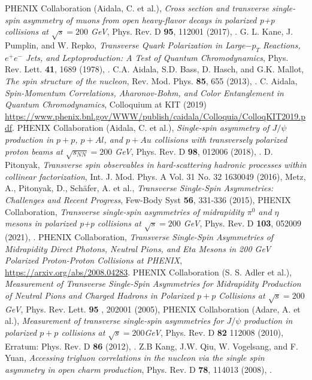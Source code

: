\documentclass[submission, Proceedings]{SciPost}
\begin{document}
\begin{thebibliography}{99}
 PHENIX Collaboration (Aidala, C. et al.), {\it Cross section and transverse single-spin asymmetry of muons from open heavy-flavor decays in polarized p+p collisions at $\sqrt{s}=200$ GeV}, Phys. Rev. D {\bf 95}, 112001 (2017), .
 G. L. Kane, J. Pumplin, and W. Repko, {\it Transverse Quark Polarization in Large$-p_{T}$ Reactions, $e^{+}e^{-}$ Jets, and Leptoproduction: A Test of Quantum Chromodynamics}, Phys. Rev. Lett. {\bf 41}, 1689 (1978), .	
 C.A. Aidala, S.D. Bass, D. Hasch, and G.K. Mallot, {\it The spin structure of the nucleon}, Rev. Mod. Phys. {\bf 85}, 655 (2013), .
 C. Aidala, {\it Spin-Momentum Correlations, Aharonov-Bohm, and Color Entanglement in Quantum Chromodynamics}, Colloquium at KIT (2019)\, \url{https://www.phenix.bnl.gov/WWW/publish/caidala/Colloquia/ColloqKIT2019.pdf}. 
 PHENIX Collaboration (Aidala, C. et al.), {\it Single-spin asymmetry of $J/\psi$ production in $p+p$, $p+Al$, and $p+Au$ collisions with transversely polarized proton beams at $\sqrt{s_{NN}}=200$ GeV}, Phys. Rev. D {\bf 98}, 012006 (2018), .	 
 D. Pitonyak, {\it Transverse spin observables in hard-scattering hadronic processes within collinear factorization}, Int. J. Mod. Phys. A Vol. 31  No. 32 1630049 (2016), 
 Metz, A., Pitonyak, D., Schäfer, A. et al., {\it Transverse Single-Spin Asymmetries: Challenges and Recent Progress}, Few-Body Syst {\bf 56}, 331-336 (2015), 	  
 PHENIX Collaboration, {\it Transverse single-spin asymmetries of midrapidity $\pi^{0}$ and $\eta$ mesons in polarized p+p collisions at $\sqrt{s}=200$ GeV}, Phys. Rev. D {\bf103}, 052009 (2021), . 
 PHENIX Collaboration, {\it Transverse Single-Spin Asymmetries of Midrapidity Direct Photons, Neutral Pions, and Eta Mesons in 200 GeV Polarized Proton-Proton Collisions at PHENIX}, \url{https://arxiv.org/abs/2008.04283}.
 PHENIX Collaboration (S. S. Adler et al.), {\it Measurement of Transverse Single-Spin Asymmetries for Midrapidity Production of Neutral Pions and Charged Hadrons in Polarized $p+p$ Collisions at $\sqrt{s}=200$ GeV}, Phys. Rev. Lett. {\bf 95 }, 202001 (2005), 	 
 PHENIX Collaboration (Adare, A. et al.), {\it Measurement of transverse single-spin asymmetries for $J/\psi$ production in polarized $p+p$ collisions at $\sqrt{s}=200$GeV}, Phys. Rev. D {\bf 82} 112008 (2010), Erratum: Phys. Rev. D {\bf 86} (2012), .	
 Z.B Kang, J.W. Qiu, W. Vogelsang, and F. Yuan, {\it Accessing trigluon correlations in the nucleon via the single spin asymmetry in open charm
production}, Phys. Rev. D {\bf 78}, 114013 (2008), .
\end{thebibliography}



\nolinenumbers
\end{document}
